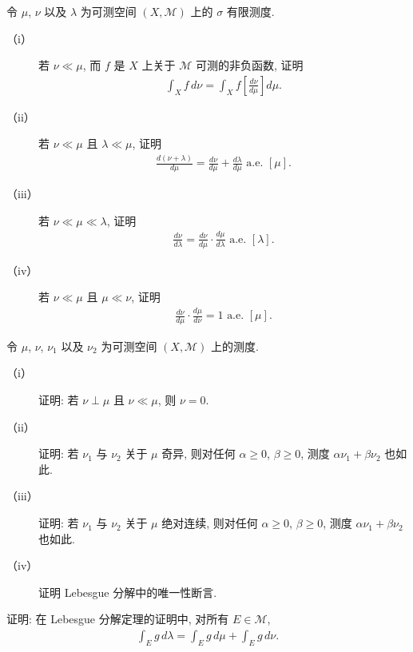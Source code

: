 \documentclass[../../main.tex]{subfiles}
\begin{document}
\begin{exercise}\label{exercise:ch18-31}
令 $\mu$, $\nu$ 以及 $\lambda$ 为可测空间 $(X,\mathcal{M})$ 上的 $\sigma$ 有限测度.
\begin{description}
\item[（i）] 若 $\nu\ll\mu$, 而 $f$ 是 $X$ 上关于 $\mathcal{M}$ 可测的非负函数, 证明
\begin{align*}
\int_{X}f\,d\nu=\int_{X}f\left[\frac{d\nu}{d\mu}\right]d\mu.
\end{align*}
\item[（ii）] 若 $\nu\ll\mu$ 且 $\lambda\ll\mu$, 证明
\begin{align*}
\frac{d(\nu+\lambda)}{d\mu}=\frac{d\nu}{d\mu}+\frac{d\lambda}{d\mu}\text{ a.e. }[\mu].
\end{align*}
\item[（iii）] 若 $\nu\ll\mu\ll\lambda$, 证明
\begin{align*}
\frac{d\nu}{d\lambda}=\frac{d\nu}{d\mu}\cdot\frac{d\mu}{d\lambda}\text{ a.e. }[\lambda].
\end{align*}
\item[（iv）] 若 $\nu\ll\mu$ 且 $\mu\ll\nu$, 证明
\begin{align*}
\frac{d\nu}{d\mu}\cdot\frac{d\mu}{d\nu}=1\text{ a.e. }[\mu].
\end{align*}
\end{description}
\end{exercise}

\begin{exercise}\label{exercise:ch18-32}
令 $\mu$, $\nu$, $\nu_{1}$ 以及 $\nu_{2}$ 为可测空间 $(X,\mathcal{M})$ 上的测度.
\begin{description}
\item[（i）] 证明: 若 $\nu\perp\mu$ 且 $\nu\ll\mu$, 则 $\nu=0$.
\item[（ii）] 证明: 若 $\nu_{1}$ 与 $\nu_{2}$ 关于 $\mu$ 奇异, 则对任何 $\alpha\geqslant 0$, $\beta\geqslant 0$, 测度 $\alpha\nu_{1}+\beta\nu_{2}$ 也如此.
\item[（iii）] 证明: 若 $\nu_{1}$ 与 $\nu_{2}$ 关于 $\mu$ 绝对连续, 则对任何 $\alpha\geqslant 0$, $\beta\geqslant 0$, 测度 $\alpha\nu_{1}+\beta\nu_{2}$ 也如此.
\item[（iv）] 证明 Lebesgue 分解中的唯一性断言.
\end{description}
\end{exercise}

\begin{exercise}\label{exercise:ch18-33}
证明: 在 Lebesgue 分解定理的证明中, 对所有 $E\in\mathcal{M}$,
\begin{align*}
\int_{E}g\,d\lambda=\int_{E}g\,d\mu+\int_{E}g\,d\nu.
\end{align*}
\end{exercise}
\end{document}
